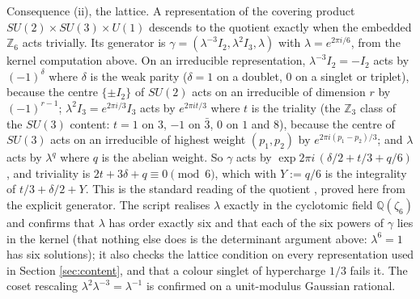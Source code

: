 Consequence (ii), the lattice. A representation of the covering product $SU(2) \times SU(3) \times U(1)$ descends to the quotient exactly when the embedded $\mathbb{Z}_{6}$ acts trivially. Its generator is $\gamma = (\lambda^{-3}I_{2}, \lambda^{2}I_{3}, \lambda)$ with $\lambda = e^{2\pi i/6}$, from the kernel computation above. On an irreducible representation, $\lambda^{-3}I_{2} = -I_{2}$ acts by $(-1)^{\delta}$ where $\delta$ is the weak parity ($\delta = 1$ on a doublet, $0$ on a singlet or triplet), because the centre $\{\pm I_{2}\}$ of $SU(2)$ acts on an irreducible of dimension $r$ by $(-1)^{r-1}$; $\lambda^{2}I_{3} = e^{2\pi i/3}I_{3}$ acts by $e^{2\pi i t/3}$ where $t$ is the triality (the $\mathbb{Z}_{3}$ class of the $SU(3)$ content: $t = 1$ on $3$, $-1$ on $\bar{3}$, $0$ on $1$ and $8$), because the centre of $SU(3)$ acts on an irreducible of highest weight $(p_{1}, p_{2})$ by $e^{2\pi i(p_{1} - p_{2})/3}$; and $\lambda$ acts by $\lambda^{q}$ where $q$ is the abelian weight. So $\gamma$ acts by $\exp 2\pi i\,(\delta/2 + t/3 + q/6)$, and triviality is $2t + 3\delta + q \equiv 0 \pmod 6$, which with $Y := q/6$ is the integrality of $t/3 + \delta/2 + Y$. This is the standard reading of the quotient \cite{BaezHuerta2010, Tong2017}, proved here from the explicit generator. The script realises $\lambda$ exactly in the cyclotomic field $\mathbb{Q}(\zeta_{6})$ and confirms that $\lambda$ has order exactly six and that each of the six powers of $\gamma$ lies in the kernel (that nothing else does is the determinant argument above: $\lambda^{6} = 1$ has six solutions); it also checks the lattice condition on every representation used in Section \ref{sec:content}, and that a colour singlet of hypercharge $1/3$ fails it. The coset rescaling $\lambda^{2}\lambda^{-3} = \lambda^{-1}$ is confirmed on a unit-modulus Gaussian rational.
